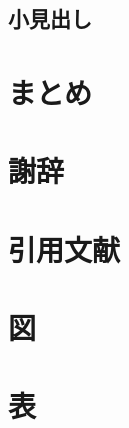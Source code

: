\documentclass[paper=a4paper,hanging_punctuation,jafontscale=0.92469,titlepage,fontsize=12pt]{jlreq}
\begin{document}
    \subsection{小見出し}

      \clearpage %
  \section{まとめ}
    \clearpage
  \section{謝辞}
    \clearpage
  \section{引用文献}%
    \noindent
    \clearpage
    \section*{図}
    \thispagestyle{empty}
    \noindent
    \thispagestyle{empty}
    \section*{表}
    \noindent
    \thispagestyle{empty}
    \clearpage
\end{document}
